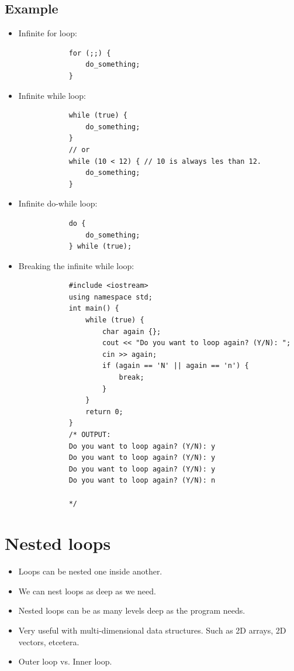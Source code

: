 \subsection{Example}
\begin{itemize}
    \item Infinite for loop:
        \begin{verbatim}
            for (;;) {
                do_something;
            }
        \end{verbatim}
    
    \item Infinite while loop:
        \begin{verbatim}
            while (true) {
                do_something;
            }
            // or
            while (10 < 12) { // 10 is always les than 12.
                do_something;
            }
        \end{verbatim}
    
    \item Infinite do-while loop:
        \begin{verbatim}
            do {
                do_something;
            } while (true);
        \end{verbatim}
    
    \item Breaking the infinite while loop:
        \begin{verbatim}
            #include <iostream>
            using namespace std;
            int main() {
                while (true) {
                    char again {};
                    cout << "Do you want to loop again? (Y/N): ";
                    cin >> again;
                    if (again == 'N' || again == 'n') {
                        break;
                    }
                }
                return 0;
            }
            /* OUTPUT:
            Do you want to loop again? (Y/N): y
            Do you want to loop again? (Y/N): y
            Do you want to loop again? (Y/N): y
            Do you want to loop again? (Y/N): n

            */
        \end{verbatim}
\end{itemize}


\section{Nested loops}
\begin{itemize}
    \item Loops can be nested one inside another.
    \item We can nest loops as deep as we need.
    \item Nested loops can be as many levels deep as the program needs.
    \item Very useful with multi-dimensional data structures. Such as 2D arrays, 2D vectors, etcetera.
    \item Outer loop vs. Inner loop.
\end{itemize}

